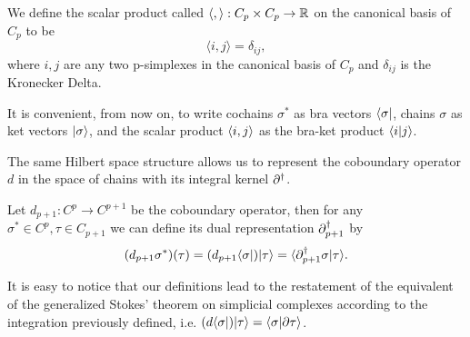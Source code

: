 \documentclass[../1.tex]{subfiles}
\begin{document}
    \begin{defn}
        We define the scalar product called  $\langle, \rangle : C_p \times C_p \to \mathbb{R}$ on the canonical basis of $C_p$ to be 
        \[ \langle i, j \rangle = \delta_{ij} ,\] 
        where $i,j$ are any two p-simplexes in the canonical basis of $C_p$ and $\delta_{ij}$ is the Kronecker Delta.
    \end{defn}
    It is convenient, from now on,  to write cochains $\sigma^*$ as bra vectors $\langle \sigma |$, chains $\sigma$ as ket vectors $| \sigma \rangle$,
    and the scalar product $\langle i, j \rangle$ as the bra-ket product $\langle i | j \rangle$.

    The same Hilbert space structure allows us to represent the coboundary operator $d$ in the space of chains with its integral kernel $\partial^\dagger$.

    \begin{defn}
        Let $d_{p+1} : C^p \to C^{p+1}$ be the coboundary operator, then for any $\sigma^* \in C^p, \tau \in C_{p+1}$ we can define its dual representation $\partial^\dagger_{p+1}$ by
        \[ (d_{p+1} \sigma^*)(\tau) = (d_{p+1} \langle \sigma |)| \tau \rangle = \langle \partial^\dagger_{p+1} \sigma | \tau \rangle. \]
    \end{defn}

    It is easy to notice that our definitions lead to the restatement of the equivalent of the generalized Stokes' theorem on simplicial complexes
    according to the integration previously defined, i.e. $(d\langle \sigma |)| \tau \rangle = \langle \sigma | \partial\tau \rangle$.
   
\end{document}
